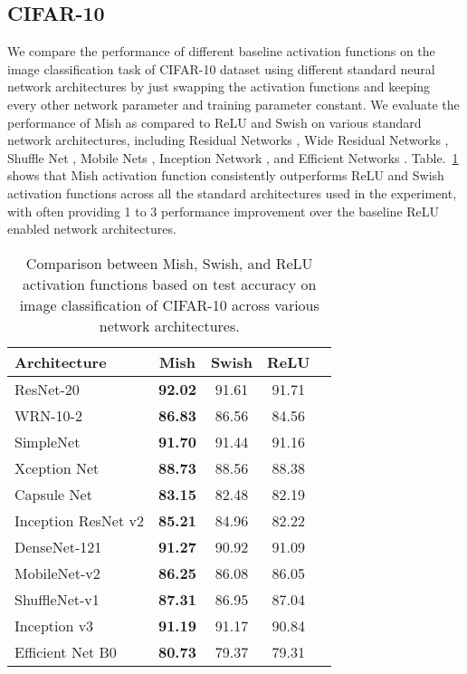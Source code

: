 \documentclass{bmvc2k}
\begin{document}
\subsection{CIFAR-10}

We compare the performance of different baseline activation functions on the image classification task of CIFAR-10 dataset \cite{krizhevsky2009learning} using different standard neural network architectures by just swapping the activation functions and keeping every other network parameter and training parameter constant. We evaluate the performance of Mish as compared to ReLU and Swish on various standard network architectures, including Residual Networks \cite{he2016deep}, Wide Residual Networks \cite{zagoruyko2016wide}, Shuffle Net \cite{zhang2018shufflenet}, Mobile Nets \cite{howard2017mobilenets}, Inception Network \cite{szegedy2015going}, and Efficient Networks \cite{tan2019efficientnet}. Table.~\ref{tab:cifar10} shows that Mish activation function consistently outperforms ReLU and Swish activation functions across all the standard architectures used in the experiment, with often providing 1 to 3 performance improvement over the baseline ReLU enabled network architectures. 

\begin{table}[h]
	\begin{center}
		\begin{tabular}{|l|c|c|c|r|}
			\hline
			Architecture & Mish & Swish & ReLU\\
			\hline\hline
			ResNet-20 \cite{he2016deep} & \textbf{92.02} & 91.61 & 91.71 \\
			WRN-10-2 \cite{zagoruyko2016wide} & \textbf{86.83} & 86.56 & 84.56 \\
			SimpleNet \cite{hasanpour2016lets} & \textbf{91.70} & 91.44 & 91.16 \\
			Xception Net \cite{chollet2017xception} & \textbf{88.73} & 88.56 & 88.38 \\
			Capsule Net \cite{sabour2017dynamic} & \textbf{83.15} & 82.48 & 82.19 \\
			Inception ResNet v2 \cite{szegedy2015going} & \textbf{85.21} & 84.96 & 82.22 \\
			DenseNet-121 \cite{huang2017densely} & \textbf{91.27} & 90.92 & 91.09 \\
			MobileNet-v2 \cite{howard2017mobilenets} & \textbf{86.25} & 86.08 & 86.05 \\
			ShuffleNet-v1 \cite{zhang2018shufflenet} & \textbf{87.31} & 86.95 & 87.04 \\
			Inception v3 \cite{szegedy2015going} & \textbf{91.19} & 91.17 & 90.84 \\
			Efficient Net B0 \cite{tan2019efficientnet} & \textbf{80.73} & 79.37 & 79.31 \\
			\hline
		\end{tabular}
	\end{center}
	\caption{Comparison between Mish, Swish, and ReLU activation functions based on test accuracy on image classification of CIFAR-10 across various network architectures.}
	\label{tab:cifar10}
\end{table}
\end{document}
